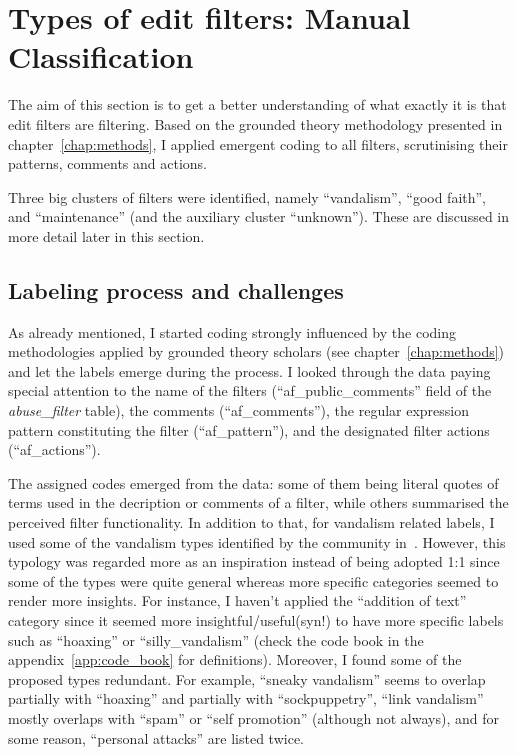 \section{Types of edit filters: Manual Classification}
\label{sec:manual-classification}

The aim of this section is to get a better understanding of what exactly it is that edit filters are filtering.
Based on the grounded theory methodology presented in chapter~\ref{chap:methods}, I applied emergent coding to all filters, scrutinising their patterns, comments and actions.

Three big clusters of filters were identified, namely ``vandalism'', ``good faith'', and ``maintenance'' (and the auxiliary cluster ``unknown''). %
These are discussed in more detail later in this section.

\subsection{Labeling process and challenges}

As already mentioned, I started coding strongly influenced by the coding methodologies applied by grounded theory scholars (see chapter~\ref{chap:methods}) and let the labels emerge during the process.
I looked through the data paying special attention to the name of the filters (``af\_public\_comments'' field of the \emph{abuse\_filter} table), the comments (``af\_comments''), the regular expression pattern constituting the filter (``af\_pattern''), and the designated filter actions (``af\_actions'').

The assigned codes emerged from the data: some of them being literal quotes of terms used in the decription or comments of a filter, while others summarised the perceived filter functionality.
In addition to that, for vandalism related labels, I used some of the vandalism types identified by the community in~\cite{Wikipedia:VandalismTypes}.
However, this typology was regarded more as an inspiration instead of being adopted 1:1 since some of the types were quite general whereas more specific categories seemed to render more insights.
For instance, I haven't applied the ``addition of text'' category since it seemed more insightful/useful(syn!) to have more specific labels such as ``hoaxing'' or ``silly\_vandalism'' (check the code book in the appendix~\ref{app:code_book} for definitions).
Moreover, I found some of the proposed types redundant.
For example, ``sneaky vandalism'' seems to overlap partially with ``hoaxing'' and partially with ``sockpuppetry'', ``link vandalism'' mostly overlaps with ``spam'' or ``self promotion'' (although not always), and for some reason, ``personal attacks'' are listed twice.


